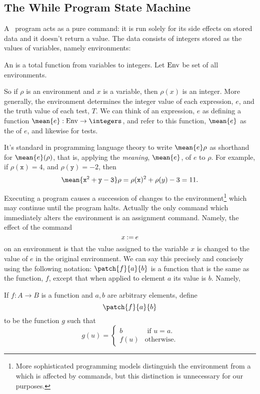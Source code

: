 \subsection{The \textbf{While}  Program State Machine}

A \while\ program acts as a pure command: it is run solely for its
side effects on stored data and it doesn't return a value.  The data
consists of integers stored as the values of variables, namely
environments:
\begin{definition}
An  is a total function from variables to integers.
Let $\text{Env}$ be set of all environments.
\end{definition}
So if $\rho$ is an environment and $x$ is a variable, then $\rho(x)$ is an
integer.  More generally, the environment determines the integer value of
each expression, $e$, and the truth value of each test, $T$.  We can think
of an expression, $e$ as defining a function $\mean{e}:\Env \to
\integers$, and refer to this function, $\mean{e}$ as the 
of $e$, and likewise for tests.

It's standard in programming language theory to write $\mean{e}\rho$
as shorthand for $\mean{e}(\rho)$, that is, applying
the \emph{meaning}, $\mean{e}$, of $e$ to $\rho$.  For example, if
$\rho(\mathtt{x}) =4$, and $\rho(\mathtt{y}) =-2$, then
\begin{equation}\label{x2y311}
\mean{\mathtt{x^2+y -3}}\rho = \rho(\mathtt{x})^2 + \rho(y) -3 = 11.
\end{equation}

\iffalse
(A variable is a special case of an expression, so $\mean{x}\rho \eqdef \rho(x)$.)
\fi

Executing a program causes a succession of changes to the
environment\footnote{More sophisticated programming models distinguish
the environment from a  which is affected by commands, but
this distinction is unnecessary for our purposes.}  which may continue
until the program halts.  Actually the only command which immediately
alters the environment is an assignment command.  Namely, the effect
of the command
\[
x \mathbin{\mathtt{:=}} e
\]
on an environment is that the value assigned to the variable $x$ is
changed to the value of $e$ in the original environment.  We can say
this precisely and concisely using the following notation:
$\patch{f}{a}{b}$ is a function that is the same as the function, $f$,
except that when applied to element $a$ its value is $b$.  Namely,
\begin{definition}
If $f:A \to B$ is a function and $a,b$ are arbitrary elements, define
  \[
\patch{f}{a}{b}
\]
to be the function $g$ such that
\begin{equation*}
g(u) = \begin{cases}
         b & \text{ if } u = a.\\
         f(u) & \text{otherwise.}
       \end{cases}
\end{equation*}
\end{definition}

